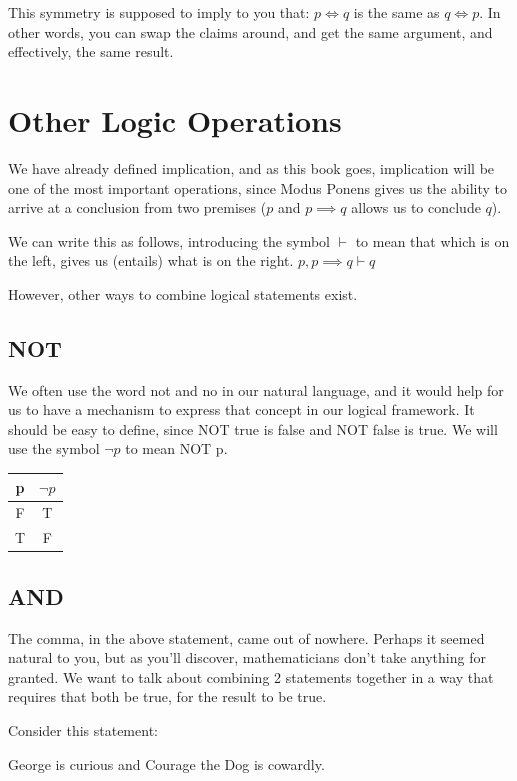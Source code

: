 This \gls{symmetry} is supposed to imply to you that: $p \iff q$ is the same as $q \iff p$. In other words, you can swap the claims around, and get the same argument, and effectively, the same result.

\section{Other Logic Operations}
We have already defined implication, and as this book goes, implication will be one of the most important operations, since Modus Ponens gives us the ability to arrive at a conclusion from two premises ($p$ and $p \implies q$ allows us to conclude $q$).

We can write this as follows, introducing the symbol $\vdash$ to mean that which is on the left, gives us (entails) what is on the right.
$p, p \implies q \vdash q$

However, other ways to combine logical statements exist.
\begin{samepage}
\subsection{NOT}
We often use the word not and no in our natural language, and it would help for us to have a mechanism to express that concept in our logical framework. It should be easy to define, since NOT true is false and NOT false is true. We will use the symbol $\neg p$ to mean NOT p.

\begin{table}[ht]
\centering
\begin{tabular}{|c|c|}
\hline
p & $\neg p $ \\ \hline
F & T \\ \hline
T & F \\ \hline
\end{tabular}
\end{table}
\end{samepage}


\subsection{AND}
The comma, in the above statement, came out of nowhere. Perhaps it seemed natural to you, but as you'll discover, mathematicians don't take anything for granted. We want to talk about combining 2 statements together in a way that requires that both be true, for the result to be true.

Consider this statement:
\begin{displayquote}
George is curious and Courage the Dog is cowardly.
\end{displayquote}


